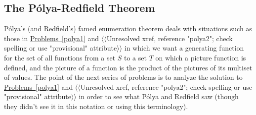 \documentclass[10pt,]{book}
\theoremstyle{plain}
\theoremstyle{definition}
\numberwithin{equation}{chapter}
\begin{document}
\subsection[{The Pólya-Redfield Theorem}]{The Pólya-Redfield Theorem}\label{subsection-69}
Pólya's (and Redfield's) famed enumeration theorem deals with situations such as those in \hyperref[polya1]{Problems~\ref{polya1}} and {$\langle\langle$Unresolved xref, reference "polya2"; check spelling or use "provisional" attribute$\rangle\rangle$} in which we want a generating function for the set of all functions from a set \(S\) to a set \(T\) on which a picture function is defined, and the picture of a function is the product of the pictures of its multiset of values. The point of the next series of problems is to analyze the solution to \hyperref[polya1]{Problems~\ref{polya1}} and {$\langle\langle$Unresolved xref, reference "polya2"; check spelling or use "provisional" attribute$\rangle\rangle$} in order to see what Pólya and Redfield saw (though they didn't see it in this notation or using this terminology).%
\end{document}
